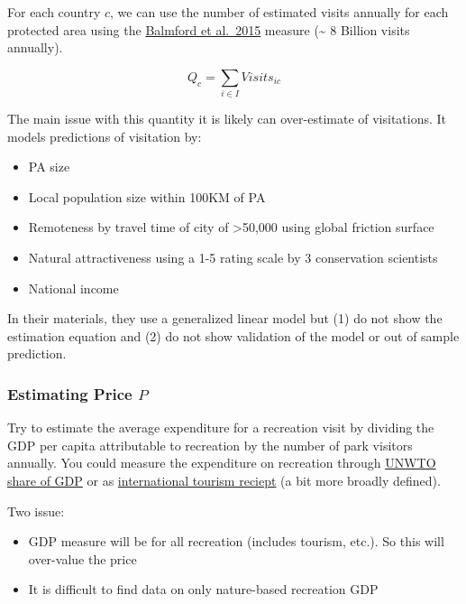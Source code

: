 \documentclass[
  letterpaper,
  DIV=11,
  numbers=noendperiod]{scrartcl}
\providecommand{\tightlist}{%
  \setlength{\itemsep}{0pt}\setlength{\parskip}{0pt}}\usepackage{longtable,booktabs,array}
\begin{document}
For each country \(c\), we can use the number of estimated visits
annually for each protected area using the
\href{https://journals.plos.org/plosbiology/article?id=10.1371/journal.pbio.1002074}{Balmford
et al.~2015} measure (\textasciitilde{} 8 Billion visits annually).

\[
Q_{c} = \sum_{i \in I} Visits_{ic}
\]

The main issue with this quantity it is likely can over-estimate of
visitations. It models predictions of visitation by:

\begin{itemize}
\tightlist
\item
  PA size
\item
  Local population size within 100KM of PA
\item
  Remoteness by travel time of city of \textgreater50,000 using global
  friction surface
\item
  Natural attractiveness using a 1-5 rating scale by 3 conservation
  scientists
\item
  National income
\end{itemize}

In their materials, they use a generalized linear model but (1) do not
show the estimation equation and (2) do not show validation of the model
or out of sample prediction.

\hypertarget{estimating-price-p}{%
\subsubsection{\texorpdfstring{Estimating Price
\(P\)}{Estimating Price P}}\label{estimating-price-p}}

Try to estimate the average expenditure for a recreation visit by
dividing the GDP per capita attributable to recreation by the number of
park visitors annually. You could measure the expenditure on recreation
through
\href{https://ourworldindata.org/grapher/tourism-gdp-proportion-of-total-gdp?time=2022}{UNWTO
share of GDP} or as
\href{https://data.worldbank.org/indicator/ST.INT.RCPT.CD?end=2020\&start=1995}{international
tourism reciept} (a bit more broadly defined).

Two issue:

\begin{itemize}
\tightlist
\item
  GDP measure will be for all recreation (includes tourism, etc.). So
  this will over-value the price
\item
  It is difficult to find data on only nature-based recreation GDP
\end{itemize}
\end{document}
